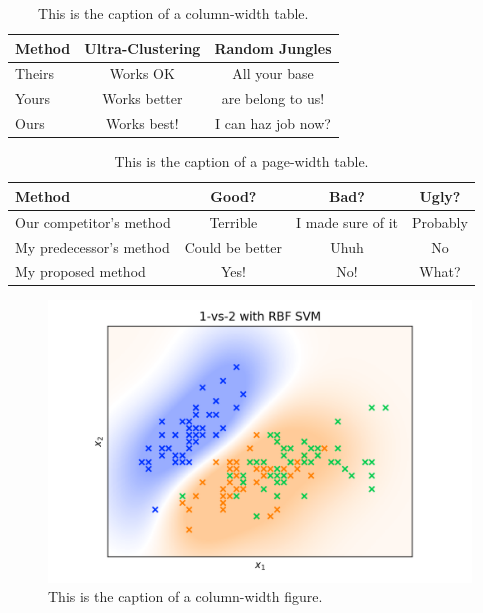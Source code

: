 \documentclass[10pt,twocolumn,letterpaper]{article}
\begin{document}
\begin{table}
   \begin{center}
   \begin{tabular}{|l|c|c|}
   \hline
   Method & Ultra-Clustering & Random Jungles \\
   \hline\hline
   Theirs & Works OK & All your base\\
   Yours & Works better & are belong to us!\\
   Ours & Works best! & I can haz job now?\\
   \hline
   \end{tabular}
   \end{center}
   \caption{This is the caption of a column-width table.\label{first_table}}
\end{table}

\begin{table}
   \begin{center}
   \begin{tabular}{|l|c|c|c|}
   \hline
   Method & Good? & Bad? & Ugly? \\
   \hline\hline
   Our competitor's method & Terrible & I made sure of it & Probably \\
   My predecessor's method & Could be better & Uhuh & No \\
   My proposed method  & Yes! & No! & What? \\
   \hline
   \end{tabular}
   \end{center}
   \caption{This is the caption of a page-width table.\label{second_table}}
\end{table}


\begin{figure}
   \begin{center}
   \includegraphics[width=\linewidth]{sample_image.png}
   \end{center}
      \caption{This is the caption of a column-width figure.\label{first_figure}}
\end{figure}
   
\end{document}
